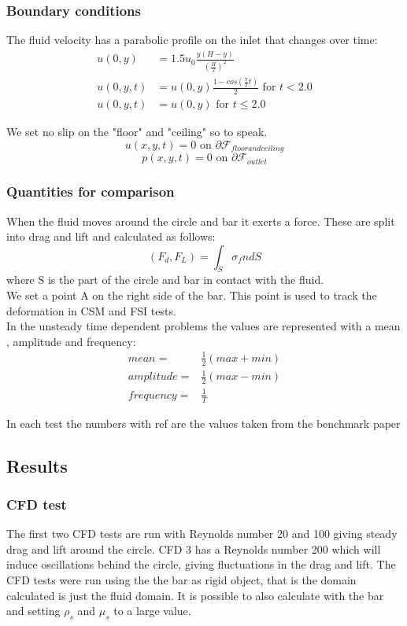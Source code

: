 \subsubsection*{Boundary conditions}
The fluid velocity has a parabolic profile on the inlet that changes over time:\\

\begin{align*}
u(0,y) &= 1.5u_0 \frac{y(H-y)}{(\frac{H}{2})^2}  \\
u(0,y,t) &= u(0,y)\frac{1-cos(\frac{\pi}{2}t)}{2} \text{  for  } t<2.0 \\
u(0,y,t) &= u(0,y) \text{  for  } t \leq 2.0
\end{align*}

We set no slip on the "floor" and "ceiling" so to speak.\\
$$ u(x,y,t) = 0 \text{  on  } \partial \mathcal{F}_{floor and ceiling} $$
$$  p(x,y,t) = 0 \text{  on  } \partial \mathcal{F}_{outlet} $$

\subsubsection*{Quantities for comparison}
When the fluid moves around the circle and bar it exerts a force. These are split into drag and lift and calculated as follows:
$$ (F_d, F_L) = \int_S \sigma_f n dS $$ 
where S is the part of the circle and bar in contact with the fluid. \\
We set a point A on the right side of the bar. This point is used to track the deformation in CSM and FSI tests. \\
In the unsteady time dependent problems the values are represented with a mean , amplitude and frequency:
\begin{align}
mean =& \frac{1}{2} (max + min) \\
amplitude =& \frac{1}{2} (max - min)\\
frequency =& \frac{1}{T}
\end{align}

In each test the numbers with ref are the values taken from the benchmark paper \cite{Hron2006a}

\subsection{Results}
\subsubsection{CFD test}
The first two CFD tests are run with Reynolds number 20 and 100 giving steady drag and lift around the circle. CFD 3 has a Reynolds number 200 which will induce oscillations behind the circle, giving fluctuations in the drag and lift.
The CFD tests were run using the the bar as rigid object, that is the domain calculated is just the fluid domain. It is possible to also calculate with the bar and setting $\rho_s$ and $\mu_s$ to a large value. 

